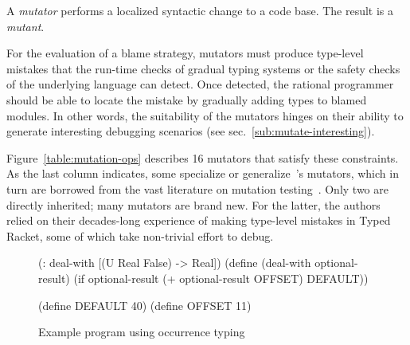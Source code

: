 
A {\it mutator\/} performs a localized syntactic change to a code base. The
result is a {\em mutant\/}.

For the evaluation of a blame strategy, mutators must produce type-level
mistakes that the run-time checks of gradual typing systems or the safety
checks of the underlying language can detect. Once detected, the rational
programmer should be able to locate the mistake by gradually adding types
to blamed modules. In other words, the suitability of the mutators hinges
on their ability to generate interesting debugging scenarios (see
sec.~\ref{sub:mutate-interesting}).


Figure~\ref{table:mutation-ops} describes 16 mutators that satisfy these
constraints. As the last column indicates, some specialize or
generalize~\citet{lksfd-popl-2020}'s mutators, which in turn are borrowed from
the vast literature on mutation testing~\citep{jia2011analysis}.  Only two are
directly inherited; many mutators are brand new. For the latter, the authors
relied on their decades-long experience of making type-level mistakes in Typed
Racket, some of which take non-trivial effort to debug.

\begin{wrapfigure}{r}{.5\textwidth} \footnotesize
\hspace{0.2cm}
\begin{module}{}\typecolor
(: deal-with [(U Real False) -> Real])
(define (deal-with optional-result)
  (if optional-result
      (+ optional-result OFFSET)
      DEFAULT))

(define DEFAULT 40)
(define OFFSET  11)
\end{module}
\caption{Example program using occurrence typing}
\label{fig:negate-cond-example}
\end{wrapfigure}

